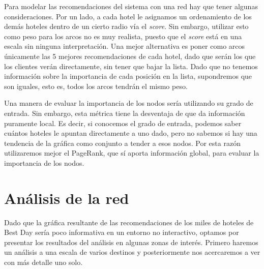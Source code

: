 \documentclass[12pt]{report}
\begin{document}
Para modelar las recomendaciones del sistema con una red hay que tener algunas consideraciones. Por un lado, a cada hotel le asignamos un ordenamiento de los demás hoteles dentro de un cierto radio vía el \emph{score}. Sin embargo, utilizar esto como peso para los arcos no es muy realista, puesto que el \emph{score} está en una escala sin ninguna interpretación. Una mejor alternativa es poner como arcos únicamente las 5 mejores recomendaciones de cada hotel, dado que serán los que los clientes verán directamente, sin tener que bajar la lista. Dado que no tenemos información sobre la importancia de cada posición en la lista, supondremos que son iguales, esto es, todos los arcos tendrán el mismo peso.

Una manera de evaluar la importancia de los nodos sería utilizando su grado de entrada. Sin embargo, esta métrica tiene la desventaja de que da información puramente local. Es decir, si conocemos el grado de entrada, podemos saber cuántos hoteles le apuntan directamente a uno dado, pero no sabemos si hay una tendencia de la gráfica como conjunto a tender a esos nodos. Por esta razón utilizaremos mejor el PageRank, que sí aporta información global, para evaluar la importancia de los nodos.

\section{Análisis de la red}

Dado que la gráfica resultante de las recomendaciones de los miles de hoteles de Best Day sería poco informativa en un entorno no interactivo, optamos por presentar los resultados del análisis en algunas zonas de interés. Primero haremos un análisis a una escala de varios destinos y posteriormente nos acercaremos a ver con más detalle uno solo.
\end{document}

